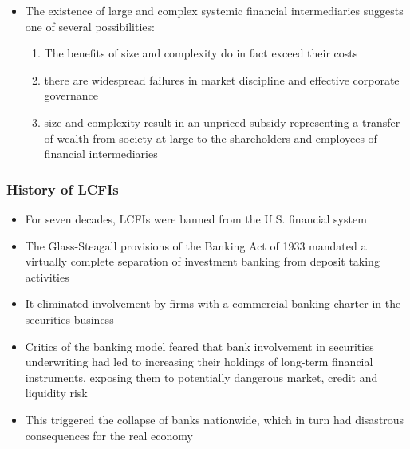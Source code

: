 \documentclass[11pt]{beamer}
\begin{document}
\begin{frame}
\begin{itemize}
\item The existence of large and complex systemic financial intermediaries suggests one of several possibilities:
\begin{enumerate}
\item The benefits of size and complexity do in fact exceed their costs
\item there are widespread failures in market discipline and effective corporate governance
\item size and complexity result in an unpriced subsidy representing a transfer of wealth from society at large to the shareholders and employees of financial intermediaries
\end{enumerate}
\end{itemize}
\end{frame}

\begin{frame}
\frametitle{History of LCFIs}
\begin{itemize}
\item For seven decades, LCFIs were banned from the U.S. financial system
\item The Glass-Steagall provisions of the Banking Act of 1933 mandated a virtually complete separation of investment banking from deposit taking activities
\item It eliminated involvement by firms with a commercial banking charter in the securities business
\item Critics of the banking model feared that bank involvement in securities underwriting had led to increasing their holdings of long-term financial instruments, exposing them to potentially dangerous market, credit and liquidity risk
\item This triggered the collapse of banks nationwide, which in turn had disastrous consequences for the real economy
\end{itemize}
\end{frame}
\end{document}
